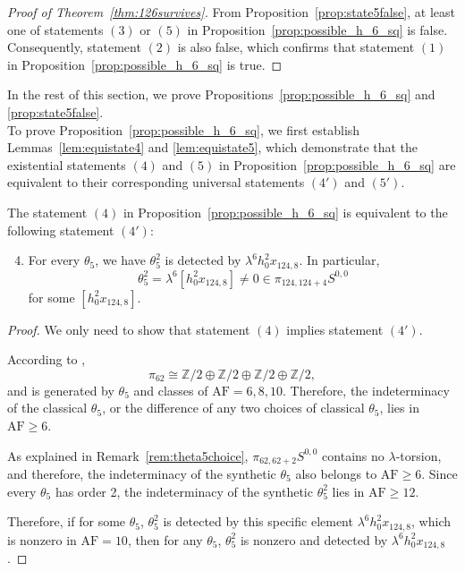 \documentclass{amsart}
\numberwithin{equation}{section}
\newcommand{\AF}{\mathrm{AF}}
\begin{document}
\begin{proof}[Proof of Theorem~\ref{thm:126survives}]
    From Proposition~\ref{prop:state5false}, at least one of  statements $(3)$ or $(5)$ in Proposition~\ref{prop:possible_h_6_sq} is false. Consequently,  statement $(2)$ is also false, which confirms that statement $(1)$ in Proposition~\ref{prop:possible_h_6_sq} is true.  
\end{proof}

In the rest of this section, we prove Propositions~\ref{prop:possible_h_6_sq} and \ref{prop:state5false}.\\

To prove Proposition~\ref{prop:possible_h_6_sq}, we first establish Lemmas~\ref{lem:equistate4} and \ref{lem:equistate5}, which demonstrate that the existential statements $(4)$ and $(5)$ in Proposition~\ref{prop:possible_h_6_sq} are equivalent to their corresponding universal statements $(4')$ and $(5')$. 

\begin{lemma} \label{lem:equistate4}
    The statement $(4)$ in Proposition~\ref{prop:possible_h_6_sq} is equivalent to the following statement $(4')$:
    \begin{enumerate}[label=(\arabic*')]\setcounter{enumi}{3} 
    \item For every $\theta_5$, we have $\theta_5^2$ is detected by $\lambda^6 h_0^2x_{124,8}$. In particular, 
    $$\theta_5^2 = \lambda^6 [h_0^2x_{124,8}] \neq 0 \in \pi_{124,124+4}S^{0,0}$$
    for some $[h_0^2x_{124,8}]$.
    \end{enumerate}
\end{lemma}

\begin{proof}
    We only need to show that statement $(4)$ implies statement $(4')$. 
    
    According to \cite{IWX}, 
    $$\pi_{62} \cong \mathbb{Z}/2 \oplus \mathbb{Z}/2 \oplus \mathbb{Z}/2 \oplus \mathbb{Z}/2,$$ 
    and is generated by $\theta_5$ and classes of $\AF=6,8,10$. Therefore, the indeterminacy of the classical $\theta_5$, or the difference of any two choices of classical $\theta_5$, lies in $\AF \ge 6$.
    
    As explained in Remark~\ref{rem:theta5choice}, $\pi_{62,62+2}S^{0,0}$ contains no $\lambda$-torsion, and therefore, the indeterminacy of the synthetic $\theta_5$ also belongs to $\AF \ge 6$. Since every $\theta_5$ has order 2, the indeterminacy of the synthetic $\theta_5^2$ lies in $\AF \ge 12$.

    Therefore, if for some $\theta_5$, $\theta_5^2$ is detected by this specific element $\lambda^6 h_0^2x_{124,8}$, which is nonzero in $\AF=10$, then for any $\theta_5$, $\theta_5^2$ is nonzero and detected by $\lambda^6 h_0^2x_{124,8}$.

\end{proof}
\end{document}
